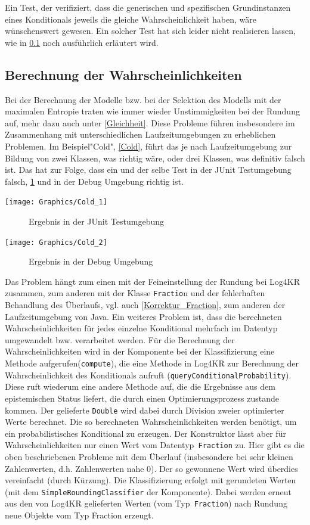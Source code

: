 \documentclass[a4paper, 11pt]{book}
\begin{document}
{Ein Test, der verifiziert, dass die generischen und spezifischen Grundinstanzen eines Konditionals jeweils die gleiche Wahrscheinlichkeit haben, wäre wünschenswert gewesen. Ein solcher Test hat sich leider nicht realisieren lassen, wie in \ref{Berechnung_Wahrscheinlichkeiten} noch ausführlich erläutert wird.


\subsection{Berechnung der Wahrscheinlichkeiten} \label{Berechnung_Wahrscheinlichkeiten}
Bei der Berechnung der Modelle bzw. bei der Selektion des Modells mit der maximalen Entropie traten wie immer wieder Unstimmigkeiten bei der Rundung auf, mehr dazu auch unter \ref{Gleichheit}. Diese Probleme führen insbesondere im Zusammenhang mit unterschiedlichen Laufzeitumgebungen zu erheblichen Problemen. Im Beispiel"{}Cold"{}, \ref{Cold}, führt das je nach Laufzeitumgebung zur Bildung von zwei Klassen, was richtig wäre, oder drei Klassen, was definitiv falsch ist. Das hat zur Folge, dass ein und der selbe Test in der JUnit Testumgebung falsch, \ref{Cold_1} und in der Debug Umgebung richtig ist.

\texttt{[image: Graphics/Cold\_1]}
\begin{figure}[h]
	\caption{Ergebnis in der JUnit Testumgebung}
	\label{Cold_1}
\end{figure}

\texttt{[image: Graphics/Cold\_2]}
\begin{figure}[h]
	\caption{Ergebnis in der Debug Umgebung}
	\label{Cold_2}
\end{figure}

Das Problem hängt zum einen mit der Feineinstellung der Rundung bei Log4KR zusammen, zum anderen mit der Klasse \texttt{Fractio}n und der fehlerhaften Behandlung des Überlaufs, vgl. auch \ref{Korrektur_Fraction}, zum anderen der Laufzeitumgebung von Java. 
Ein weiteres Problem ist, dass die berechneten Wahrscheinlichkeiten für jedes einzelne Konditional mehrfach im Datentyp umgewandelt bzw. verarbeitet werden. Für die Berechnung der Wahrscheinlichkeiten wird in der Komponente bei der Klassifizierung eine Methode aufgerufen(\texttt{compute}), die eine Methode in Log4KR zur Berechnung der Wahrscheinlichkeit des Konditionals aufruft (\texttt{queryConditionalProbability}). Diese ruft wiederum eine andere Methode auf, die die Ergebnisse aus dem epistemischen Status liefert, die durch einen Optimierungsprozess zustande kommen. Der gelieferte \texttt{Double} wird dabei durch Division zweier optimierter Werte berechnet. Die so berechneten Wahrscheinlichkeiten werden benötigt, um ein probabilistisches Konditional zu erzeugen. Der Konstruktor lässt aber für Wahrscheinlichkeiten nur einen Wert vom Datentyp\texttt{ Fraction} zu. Hier gibt es die oben beschriebenen Probleme mit dem Überlauf (insbesondere bei sehr kleinen Zahlenwerten, d.h. Zahlenwerten nahe 0). Der so gewonnene Wert wird überdies vereinfacht (durch Kürzung). Die Klassifizierung erfolgt mit gerundeten Werten (mit dem \texttt{SimpleRoundingClassifier} der Komponente). Dabei werden erneut aus den von Log4KR gelieferten Werten (vom Typ\texttt{ Fraction}) nach Rundung neue Objekte vom Typ Fraction erzeugt.

}
\end{document}
